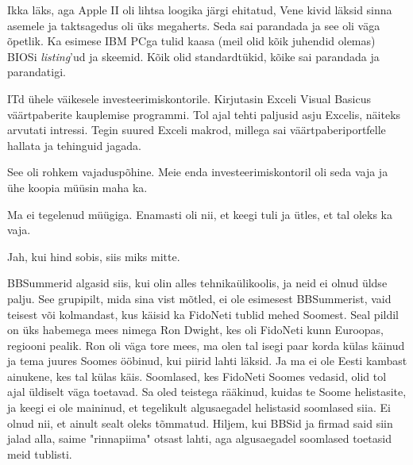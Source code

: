 
Ikka läks, aga Apple II oli 
lihtsa loogika järgi ehitatud, Vene kivid läksid sinna asemele ja taktsagedus oli üks 
megaherts. Seda sai parandada ja see oli väga õpetlik. Ka 
esimese IBM PCga tulid kaasa (meil olid 
kõik juhendid olemas) BIOSi \emph{listing}'ud ja skeemid. Kõik olid 
standardtükid, kõike sai parandada ja parandatigi. 


ITd ühele väikesele investeerimiskontorile. Kirjutasin 
Exceli Visual Basicus väärtpaberite 
kauplemise programmi. Tol ajal tehti paljusid asju Excelis, näiteks arvutati intressi. Tegin suured Exceli makrod, millega sai 
väärtpaberiportfelle hallata ja tehinguid jagada. 


See oli rohkem vajaduspõhine. Meie enda investeerimiskontoril oli seda 
vaja ja ühe koopia müüsin maha ka. 


Ma ei tegelenud müügiga. Enamasti oli nii, et keegi tuli ja ütles, et tal 
oleks ka vaja. 


Jah, kui hind sobis, siis miks mitte.


BBSummerid algasid siis, kui olin alles tehnikaülikoolis, ja neid ei olnud üldse palju. See grupipilt, mida sina vist 
mõtled, ei ole esimesest BBSummerist, vaid teisest või kolmandast, kus käisid ka FidoNeti tublid mehed Soomest. Seal 
pildil on üks habemega mees nimega Ron Dwight, kes 
oli FidoNeti kunn Euroopas, regiooni pealik. Ron 
oli väga tore mees, ma olen tal isegi paar korda külas käinud ja tema juures Soomes 
ööbinud, kui piirid lahti läksid. Ja ma ei ole Eesti kambast ainukene, kes tal
külas käis. 
Soomlased, kes FidoNeti Soomes vedasid, olid tol ajal üldiselt väga toetavad. 
Sa oled teistega rääkinud, kuidas te Soome helistasite, ja keegi ei ole 
maininud, et tegelikult algusaegadel helistasid soomlased siia. Ei olnud nii, 
et ainult sealt oleks tõmmatud. Hiljem, kui BBSid ja firmad said siin jalad 
alla, saime "rinnapiima" otsast lahti, aga algusaegadel 
soomlased toetasid meid tublisti. 

